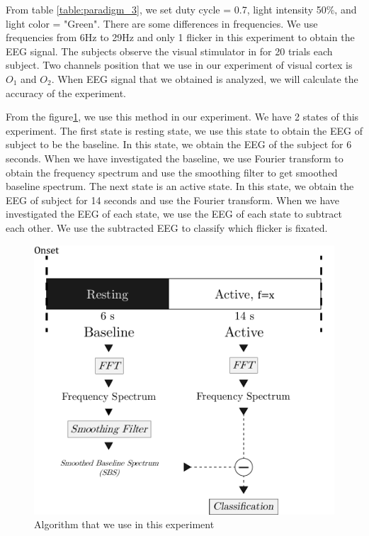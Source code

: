 From table \ref{table:paradigm_3}, we set duty cycle = 0.7, light intensity 50\%, and light color = "Green". There are some differences in frequencies. We use frequencies from 6Hz to 29Hz and only 1 flicker in this experiment to obtain the EEG signal. The subjects observe the visual stimulator in for 20 trials each subject. Two channels position that we use in our experiment of visual cortex is $O_1$ and $O_2$. When EEG signal that we obtained is analyzed, we will calculate the accuracy of the experiment.\par
From the figure\ref{fig:method}, we use this method in our experiment. We have 2 states of this experiment. The first state is resting state, we use this state to obtain the EEG of subject to be the baseline. In this state, we obtain the EEG of the subject for 6 seconds. When we have investigated the baseline, we use Fourier transform to obtain the frequency spectrum and use the smoothing filter to get smoothed baseline spectrum. The next state is an active state. In this state, we obtain the EEG of subject for 14 seconds and use the Fourier transform. When we have investigated the EEG of each state, we use the EEG of each state to subtract each other. We use the subtracted EEG to classify which flicker is fixated.


\begin{figure}[ht]
	\centering
	\includegraphics[scale = 0.7]{chapter7/method.pdf}
	\caption{Algorithm that we use in this experiment}
    \label{fig:method}
\end{figure}

